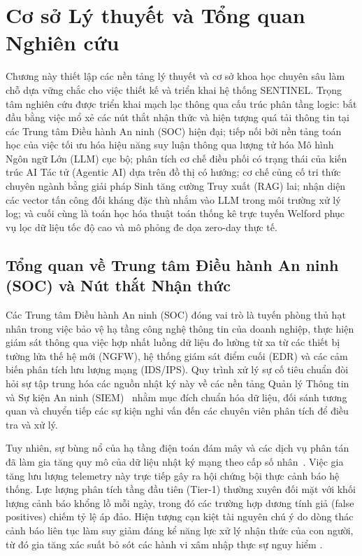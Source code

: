 \chapter{Cơ sở Lý thuyết và Tổng quan Nghiên cứu}
\label{ch:theoretical_background}

Chương này thiết lập các nền tảng lý thuyết và cơ sở khoa học chuyên sâu làm chỗ dựa vững chắc cho việc thiết kế và triển khai hệ thống SENTINEL. Trọng tâm nghiên cứu được triển khai mạch lạc thông qua cấu trúc phân tầng logic: bắt đầu bằng việc mổ xẻ các nút thắt nhận thức và hiện tượng quá tải thông tin tại các Trung tâm Điều hành An ninh (SOC) hiện đại; tiếp nối bởi nền tảng toán học của việc tối ưu hóa hiệu năng suy luận thông qua lượng tử hóa Mô hình Ngôn ngữ Lớn (LLM) cục bộ; phân tích cơ chế điều phối có trạng thái của kiến trúc AI Tác tử (Agentic AI) dựa trên đồ thị có hướng; cơ chế củng cố tri thức chuyên ngành bằng giải pháp Sinh tăng cường Truy xuất (RAG) lai; nhận diện các vector tấn công đối kháng đặc thù nhắm vào LLM trong môi trường xử lý log; và cuối cùng là toán học hóa thuật toán thống kê trực tuyến Welford phục vụ lọc dữ liệu tốc độ cao và mô phỏng đe dọa zero-day thực tế.

\section{Tổng quan về Trung tâm Điều hành An ninh (SOC) và Nút thắt Nhận thức}

Các Trung tâm Điều hành An ninh (SOC) đóng vai trò là tuyến phòng thủ hạt nhân trong việc bảo vệ hạ tầng công nghệ thông tin của doanh nghiệp, thực hiện giám sát thông qua việc hợp nhất luồng dữ liệu đo lường từ xa từ các thiết bị tường lửa thế hệ mới (NGFW), hệ thống giám sát điểm cuối (EDR) và các cảm biến phân tích lưu lượng mạng (IDS/IPS). Quy trình xử lý sự cố tiêu chuẩn đòi hỏi sự tập trung hóa các nguồn nhật ký này về các nền tảng Quản lý Thông tin và Sự kiện An ninh (SIEM)~\cite{siem2021} nhằm mục đích chuẩn hóa dữ liệu, đối sánh tương quan và chuyển tiếp các sự kiện nghi vấn đến các chuyên viên phân tích để điều tra và xử lý.

Tuy nhiên, sự bùng nổ của hạ tầng điện toán đám mây và các dịch vụ phân tán đã làm gia tăng quy mô của dữ liệu nhật ký mạng theo cấp số nhân~\cite{bigdata2019}. Việc gia tăng lưu lượng telemetry này trực tiếp gây ra hội chứng bội thực cảnh báo hệ thống. Lực lượng phân tích tầng đầu tiên (Tier-1) thường xuyên đối mặt với khối lượng cảnh báo khổng lồ mỗi ngày, trong đó các trường hợp dương tính giả (false positives) chiếm tỷ lệ áp đảo. Hiện tượng cạn kiệt tài nguyên chú ý do dòng thác cảnh báo liên tục làm suy giảm đáng kể năng lực xử lý nhận thức của con người, từ đó gia tăng xác suất bỏ sót các hành vi xâm nhập thực sự nguy hiểm \cite{alertfatigue2022}.

